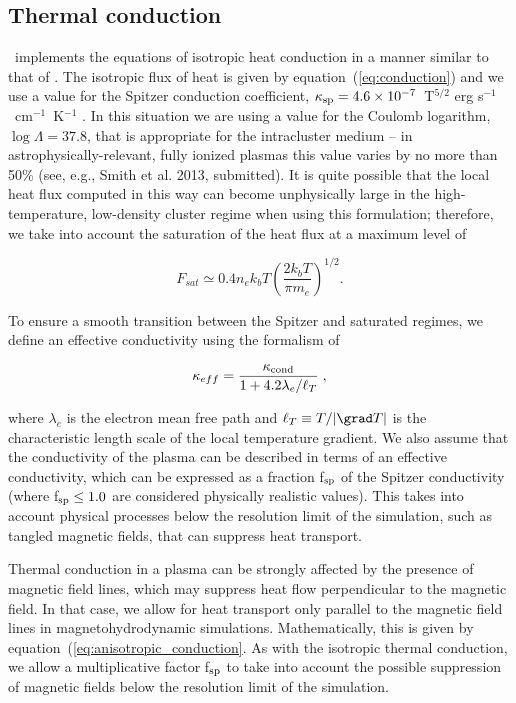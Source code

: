 \subsection{Thermal conduction}
\label{sec.num.conductions}

\enzo\ implements the equations of isotropic heat conduction in a
manner similar to that of \citet{2007ApJ...664..135P}.  The isotropic
flux of heat is given by equation~(\ref{eq:conduction}) and we use a
value for the Spitzer conduction coefficient, $\kappa_{\rm sp} = 4.6
\times 10^{-7}$~T$^{5/2}$ erg s$^{-1}$~cm$^{-1}$~K$^{-1}$
\citep{1962pfig.book.....S}.  In this situation we are using a value
for the Coulomb logarithm, $\log \Lambda = 37.8$, that is appropriate
for the intracluster medium \citep{1988xrec.book.....S} -- in
astrophysically-relevant, fully ionized plasmas this value varies by
no more than 50\% (see, e.g., Smith et al. 2013, submitted).  It is
quite possible that the local heat flux computed in this way can
become unphysically large in the high-temperature, low-density cluster
regime when using this formulation; therefore, we take into account
the saturation of the heat flux \citep{1977ApJ...211..135C} at a
maximum level of

\begin{equation}
F_{sat} \simeq 0.4 n_e k_b T \left( \frac{2 k_b T}{\pi m_e} \right)^{1/2}.
\end{equation}

To ensure a smooth transition between the Spitzer and saturated
regimes, we define an effective conductivity using the formalism of
\citet{1988xrec.book.....S}

\begin{equation}
\kappa_{eff} = \frac{\kappa_{\rm cond}}{1 + 4.2 \lambda_e / \ell_T} \; ,
\end{equation}

where $\lambda_e$ is the electron mean free path and $\ell_T \equiv T
/ |\grad T|$ is the characteristic length scale of the local
temperature gradient.  We also assume that the conductivity of the
plasma can be described in terms of an effective conductivity, which
can be expressed as a fraction f$_{\rm sp}$ of the Spitzer
conductivity (where f$_{\rm sp} \leq 1.0$ are considered physically
realistic values).  This takes into account physical processes below
the resolution limit of the simulation, such as tangled magnetic
fields, that can suppress heat transport.

Thermal conduction in a plasma can be strongly affected by the
presence of magnetic field lines, which may suppress heat flow
perpendicular to the magnetic field.  In that case, we allow for heat
transport only parallel to the magnetic field lines in
magnetohydrodynamic simulations.  Mathematically, this is given by
equation~(\ref{eq:anisotropic_conduction}.  As with the isotropic
thermal conduction, we allow a multiplicative factor f$_{\rm sp}$ to
take into account the possible suppression of magnetic fields below
the resolution limit of the simulation.


